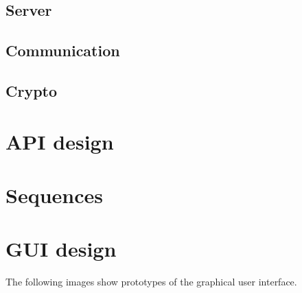 \documentclass[a4paper,10pt]{scrartcl}
\begin{document}
\subsection{Server}
\subsection{Communication}
\subsection{Crypto}


\section{API design}


\section{Sequences}

%

\section{GUI design}
The following images show prototypes of the graphical user interface.
\end{document}
